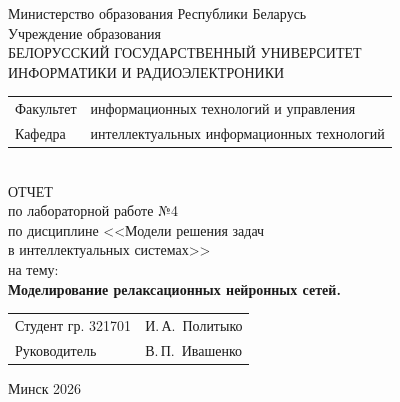 \begin{titlepage}
	\begin{center}
		Министерство образования Республики Беларусь\\[1em]
		Учреждение образования\\
		БЕЛОРУССКИЙ ГОСУДАРСТВЕННЫЙ УНИВЕРСИТЕТ \\
		ИНФОРМАТИКИ И РАДИОЭЛЕКТРОНИКИ\\[1em]
		
		\begin{minipage}{\textwidth}
			\begin{flushleft}
				\begin{tabular}{ l l }
					Факультет & информационных технологий и управления\\
					Кафедра   & интеллектуальных информационных технологий
				\end{tabular}
			\end{flushleft}
		\end{minipage}\\[1em]
		
		{ОТЧЕТ}\\
		{по лабораторной работе №4}\\
		{по дисциплине <<Модели решения задач}\\
		{в интеллектуальных системах>>}\\
		{на тему:}\\[1em]
		\textbf{Моделирование релаксационных нейронных сетей.}\\[1em]
		
		\vspace{2em}
		\begin{tabular}{ p{}p{} }
			Студент гр. 321701 & И.\,А.~Политыко \\
			Руководитель & В.\,П.~Ивашенко \\
		\end{tabular}
		
		\vfill
		{\normalsize Минск 2026}
	\end{center}
\end{titlepage}
